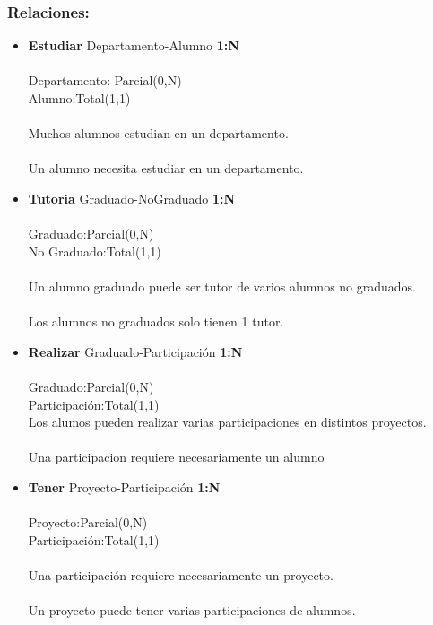 \subsubsection*{Relaciones:}
\begin{itemize}
    \item \textbf{Estudiar} Departamento-Alumno \textbf{1:N}\\ \\
    Departamento: Parcial(0,N)\\
    Alumno:Total(1,1)\\ \\
    Muchos alumnos estudian en un  departamento. \\ \\
    Un alumno necesita estudiar en un departamento. \\
     
    \item \textbf{Tutoria} Graduado-NoGraduado \textbf{1:N}\\ \\
    Graduado:Parcial(0,N)\\
    No Graduado:Total(1,1)\\ \\
    Un alumno graduado puede ser tutor de varios alumnos no graduados. \\ \\
    Los alumnos no graduados solo tienen 1 tutor.

    \item \textbf{Realizar} Graduado-Participación \textbf{1:N}\\ \\
    Graduado:Parcial(0,N)\\
    Participación:Total(1,1)\\

    Los alumos pueden realizar varias participaciones en distintos proyectos.\\ \\
    Una participacion requiere necesariamente un alumno

\item \textbf{Tener} Proyecto-Participación \textbf{1:N}\\ \\
    Proyecto:Parcial(0,N)\\
    Participación:Total(1,1)\\ \\
    Una participación requiere necesariamente un proyecto.\\ \\
    Un proyecto puede tener varias participaciones de alumnos.
 

\end{itemize}
